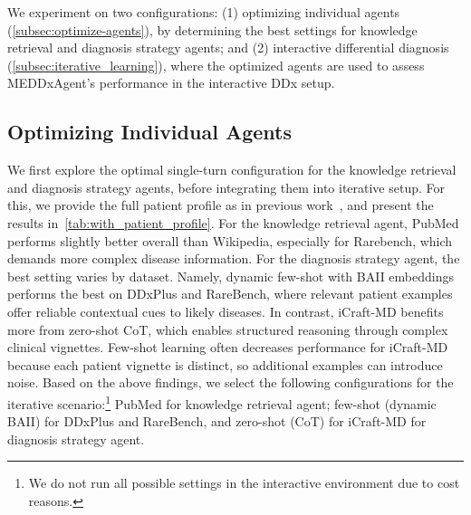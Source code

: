 \label{evaluation-results}


We experiment on two configurations: (1) optimizing individual agents (\autoref{subsec:optimize-agents}), by determining the best settings for knowledge retrieval and diagnosis strategy agents; and (2) interactive differential diagnosis (\autoref{subsec:iterative_learning}), where the optimized agents are used to assess MEDDxAgent's performance in the interactive DDx setup.

\subsection{Optimizing Individual Agents}
\label{subsec:optimize-agents}

We first explore the optimal single-turn configuration for the knowledge retrieval and diagnosis strategy agents, before integrating them into iterative setup. For this, we provide the full patient profile as in previous work~\cite{wu2024streambench,chen2024rarebench}, and present the results in~\autoref{tab:with_patient_profile}. For the knowledge retrieval agent, PubMed performs slightly better overall than Wikipedia, especially for Rarebench, which demands more complex disease information. For the diagnosis strategy agent, the best setting varies by dataset. 
Namely, dynamic few-shot with BAII embeddings performs the best on DDxPlus and RareBench, where relevant patient examples offer reliable contextual cues to likely diseases. 
In contrast, iCraft-MD benefits more from zero-shot CoT, which enables structured reasoning through complex clinical vignettes. Few-shot learning often decreases performance for iCraft-MD because each patient vignette is distinct, so additional examples can introduce noise.
Based on the above findings, we select the following configurations for the iterative scenario:\footnote{We do not run all possible settings in the interactive environment due to cost reasons.} PubMed for knowledge retrieval agent; few-shot (dynamic BAII) for DDxPlus and RareBench, and zero-shot (CoT) for iCraft-MD for diagnosis strategy agent.


